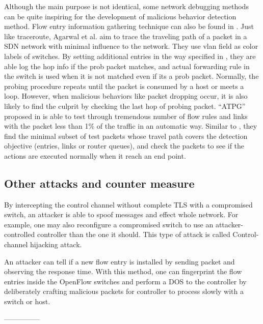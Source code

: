 Although the main purpose is not identical, some network debugging methods can be quite inspiring for the development of malicious behavior detection method. Flow entry information gathering technique can also be found in \cite{ARDC14}. Just like traceroute, Agarwal et al. aim to trace the traveling path of a packet in a SDN network with minimal influence to the network. They use vlan field as color labels of switches. By setting additional entries in the way specified in \cite{ARDC14}, they are able log the hop info if the prob packet matches, and actual forwarding rule in the switch is used when it is not matched even if its a prob packet. Normally, the probing procedure repeats until the packet is consumed by a host or meets a loop. However, when malicious behaviors like packet dropping occur, it is also likely to find the culprit by checking the last hop of probing packet. ``ATPG'' proposed in \cite{ZKVM12} is able to test through tremendous number of flow rules and links with the packet less than 1\% of the traffic in an automatic way. 
Similar to \cite{PJL16}, they find the minimal subset of test packets whose travel path covers the detection objective (entries, links or router queues), and check the packets to see if the actions are executed normally when it reach an end point. 

\subsection{Other attacks and counter measure}
By intercepting the control channel without complete TLS with a compromised switch, an attacker is able to spoof messages and effect whole network. For example, one may also reconfigure a compromised switch to use an attacker-controlled controller than the one it should. This type of attack is called Control-channel hijacking attack.


An attacker can tell if a new flow entry is installed by sending packet and observing the response time. With this method, one can fingerprint the flow entries inside the OpenFlow switches and perform a DOS to the controller by deliberately crafting malicious packets for controller to process slowly with a switch or host\cite{AAS14}.

---------------